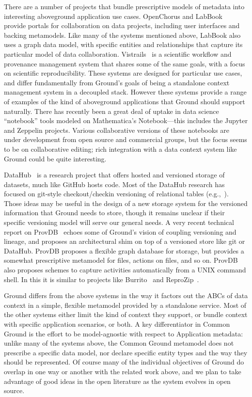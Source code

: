 \documentclass{cidr-2017}
\begin{document}
There are a number of projects that bundle prescriptive models of metadata into interesting aboveground application use cases.
OpenChorus and LabBook~\cite{kandogan2015labbook} provide portals for collaboration on data projects, including user interfaces and backing metamodels. Like many of the systems mentioned above, LabBook also uses a graph data model, with specific entities and relationships that capture its particular model of data collaboration.
Vistrails~\cite{vistrails} is a scientific workflow and provenance management system that shares some of the same goals, with a focus on scientific reproducibility. These systems are designed for particular use cases, and differ fundamentally from Ground's goals of being a standalone context management system in a decoupled stack. However these systems provide a range of examples of the kind of aboveground applications that Ground should support naturally. There has recently been a great deal of uptake in data science ``notebook'' tools modeled on Mathematica's Notebook---this includes the Jupyter and Zeppelin projects. Various collaborative versions of these notebooks are under development from open source and commercial groups, but the focus seems to be on collaborative editing; rich integration with a data context system like Ground could be quite interesting.

DataHub~\cite{datahub} is a research project that offers hosted and versioned storage of datasets, much like GitHub hosts code. Most of the DataHub research has focused on git-style checkout/checkin versioning of relational tables (e.g.,~\cite{decibel}).  Those ideas may be useful in the design of a new storage system for the versioned information that Ground needs to store, though it remains unclear if their specific versioning model will serve our general needs. A very recent technical report on ProvDB~\cite{provdb} echoes some of Ground's vision of coupling versioning and lineage, and proposes an architectural shim on top of a versioned store like git or DataHub. ProvDB proposes a flexible graph database for storage, but provides a somewhat prescriptive metamodel for files, actions on files, and so on. ProvDB also proposes schemes to capture activities automatically from a UNIX command shell. In this it is similar to projects like Burrito~\cite{burrito} and ReproZip~\cite{reprozip}.


Ground differs from the above systems in the way it factors out the ABCs of data context in a simple, flexible metamodel provided by a standalone service. Most of the other systems either limit the kind of context they support, or bundle context with specific application scenarios, or both. A key differentiator in Common Ground is the effort to be model-agnostic with respect to Application metadata: unlike many of the systems above, the Common Ground metamodel does not prescribe a specific data model, nor declare specific entity types and the way they should be represented.  Of course many of the individual objectives of Ground do overlap in one way or another with the related work above, and we plan to take advantage of good ideas in the open literature as the system evolves in open source.
\end{document}
